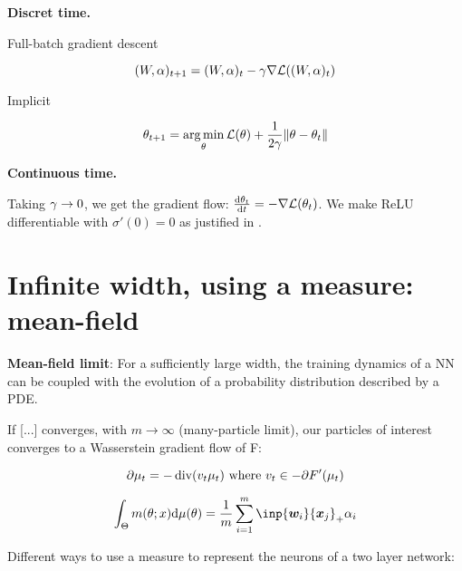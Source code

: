 \textbf{Discret time.}

Full-batch gradient descent

\begin{equation}
	(W, \alpha)_{t+1} = (W, \alpha)_t - \gamma \nabla \mathcal{L}((W, \alpha)_t)
\end{equation}

Implicit

\begin{equation}
	\theta_{t+1} = \operatorname*{arg\,min}_{\theta} \mathcal{L}(\theta) +\frac{1}{2\gamma} \lVert\theta - \theta_t\rVert
\end{equation}

\textbf{Continuous time.}

Taking $\gamma \to 0$, we get the gradient flow: $\frac{\mathrm{d} \theta_t}{\mathrm{d} t} = - \nabla \mathcal{L}(\theta_t)$. We make ReLU differentiable with $\sigma'(0)=0$ as justified in \citep{boursierGradientFlowDynamics2022}.

\section{Infinite width, using a measure: mean-field}

\textbf{Mean-field limit}\citep{chizatGlobalConvergenceGradient2018}: For a sufficiently large width, the training dynamics of a NN can be coupled with the evolution of a probability distribution described by a PDE.

If [...] converges, with $m \rightarrow \infty$ (many-particle limit), our particles of interest converges to a Wasserstein gradient flow of F:

\begin{equation}
	\partial \mu_t = - \operatorname*{div}(v_t \mu_t) \text{ where } v_t \in - \partial F'(\mu_t)
\end{equation}

\begin{equation}
	\int_\paramS m(\param; x) \dd \mu(\param) = \frac{1}{m} \sum_{i=1}^{m} \inp{\vw_i}{\vx_j}_+ \alpha_i
\end{equation}

Different ways to use a measure to represent the neurons of a two layer network:

